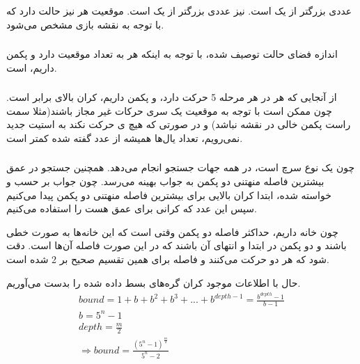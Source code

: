 \documentclass{university}
\begin{document}
\subsubsection{}
عددی بزرگتر از یک است. 
نیز عددی بزرگتر از یک است. موقعیت هر 
نیز 
حالت دارد که با توجه به نقشه بازی 
مشخص می‌شود.

\subsubsection{}
اندازه فضای حالت توصیف شده، با توجه به اینکه هر 
به تعداد 
موقعیت دارد و 
پکمن داریم، 
است. 

\subsubsection{}
از آنجایی که هر 
در هر مرحله 5 حرکت دارد، و 
پکمن داریم، کران بالای 
برابر 
است. چون ممکن است با توجه به موقعیت یک سری حرکات غیر مجاز باشند(مثلا سمت راست پکمن خالی در نقشه نباشد) 
و در صورتی که هیچ 
ی
حرکت نکند به استیت جدید نمی‌رویم،
تعداد یال‌ها همیشه از عدد گفته شده کمتر است. 

\subsubsection{}
چون 
یک نوع سرچ 
است، در همه جهات جستجو انجام می‌دهد. همچنین جستجو در عمق بیشترین فاصله منهتنی دو پکمن به 
جواب بهینه می‌رسد. چون جواب بر حسب 
 و  
خواسته شده، ابتدا کران بالایی برای بیشترین فاصله منهتنی دو پکمن پیدا می‌کنیم سپس این عدد که کرانی برای عمق هست را 
استفاده می‌کنیم. 

چون 
خانه داریم، حداکثر فاصله دو پکمن وقتی است که این خانه‌ها به صورت خطی باشند و دو پکمن در 
ابتدا و انتهای آن باشند که در این صورت فاصله آن‌ها 
است. دقت شود که هر دو حرکت می‌کنند و فاصله برای همین تقسیم صحیح بر 2 شده است. 

حال با اطلاعات موجود کران گره‌های بسط داده شده را بدست می‌آوریم. 
\begin{gather*}
    bound = 1 + b + b^2 + b^3 + ... + b^{depth-1} = \frac{b^{depth} - 1}{b - 1}\\
    b = 5^n - 1 \\
    depth = \frac{m}{2} \\
    \Rightarrow bound = \frac{(5^n-1)^{\frac{m}{2}}}{5^n - 2}
\end{gather*}
\end{document}
